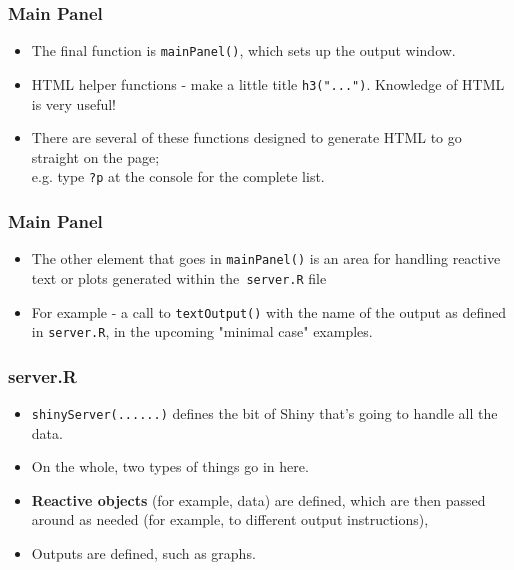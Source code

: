 \documentclass{beamer}
\begin{document}
\begin{frame}
\frametitle{Main Panel}
\Large
\vspace{-1cm}
\begin{itemize}
\item The final function is \texttt{mainPanel()}, which sets up the output window. 
\item  HTML helper functions - make a little title \texttt{h3("...")}. Knowledge of HTML is very useful!
\item There are several of these functions designed to generate HTML to go straight on
the page; \\e.g. type \texttt{?p} at the console for the complete list. 
\end{itemize}
\end{frame}
\begin{frame}
\Large
\frametitle{Main Panel}
\begin{itemize}
\item The other element that goes in
\texttt{mainPanel()} is an area for handling reactive text or plots generated within the\texttt{ server.R}
file
\item For example - a call to \texttt{textOutput()} with the name of the output as defined in
\texttt{server.R}, in the upcoming "minimal case" examples.
\end{itemize}
\end{frame}
\begin{frame}
\frametitle{server.R}
\Large

\begin{itemize}
\item \texttt{shinyServer(...{...})} defines the bit of Shiny that's
going to handle all the data. 
\item On the whole, two types of things go in here. \item \textbf{Reactive
objects} (for example, data) are defined, which are then passed around as needed (for
example, to different output instructions), \item Outputs are defined, such as graphs.
\end{itemize}
\end{frame}

\end{document}
